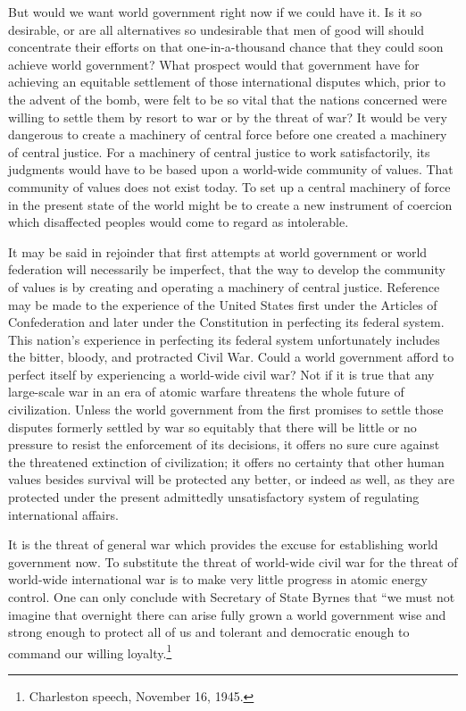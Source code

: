 But would we want world government right now if we could have it. Is it so desirable, or are all alternatives so undesirable that men of good will should concentrate their efforts on that one-in-a-thousand chance that they could soon achieve world government? What prospect would that government have for achieving an equitable settlement of those international disputes which, prior to the advent of the bomb, were felt to be so vital that the nations concerned were willing to settle them by resort to war or by the threat of war? It would be very dangerous to create a machinery of central force before one created a machinery of central justice. For a machinery of central justice to work satisfactorily, its judgments would have to be based upon a world-wide community of values. That community of values does not exist today. To set up a central machinery of force in the present state of the world might be to create a new instrument of coercion which disaffected peoples would come to regard as intolerable.

It may be said in rejoinder that first attempts at world government or world federation will necessarily be imperfect, that the way to develop the community of values is by creating and operating a machinery of central justice. Reference may be made to the experience of the United States first under the Articles of Confederation and later under the Constitution in perfecting its federal system. This nation's experience in perfecting its federal system unfortunately includes the bitter, bloody, and protracted Civil War. Could a world government afford to perfect itself by experiencing a world-wide civil war? Not if it is true that any large-scale war in an era of atomic warfare threatens the whole future of civilization. Unless the world government from the first promises to settle those disputes formerly settled by war so equitably that there will be little or no pressure to resist the enforcement of its decisions, it offers no sure cure against the threatened extinction of civilization; it offers no certainty that other human values besides survival will be protected any better, or indeed as well, as they are protected under the present admittedly unsatisfactory system of regulating international affairs.

It is the threat of general war which provides the excuse for establishing world government now. To substitute the threat of world-wide civil war for the threat of world-wide international war is to make very little progress in atomic energy control. One can only conclude with Secretary of State Byrnes that ``we must not imagine that overnight there can arise fully grown a world government wise and strong enough to protect all of us and tolerant and democratic enough to command our willing loyalty.\footnote{Charleston speech, November 16, 1945.}


